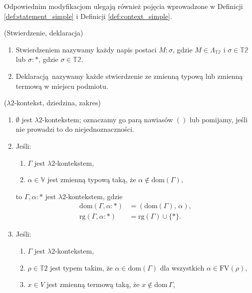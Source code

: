 Odpowiednim modyfikacjom ulegają również pojęcia wprowadzone w Definicji \ref{def:statement_simple} i Definicji \ref{def:context_simple}.
\begin{definicja}(Stwierdzenie, deklaracja)
    \begin{enumerate}
  \setlength\itemsep{0em}
    \item Stwierdzeniem nazywamy każdy napis postaci \(M:\sigma\), gdzie \(M\in\Lambda_\mathbb{T2}\) i \(\sigma\in \mathbb{T2}\) lub \(\sigma:*\), gdzie \(\sigma\in\mathbb{T2}\).
    \item  Deklaracją nazywamy każde stwierdzenie ze zmienną typową lub zmienną termową w miejscu podmiotu.
  \end{enumerate}

\end{definicja}
\begin{definicja}(\(\lambda 2\)-kontekst, dziedzina, zakres)\label{def:f_statement}
  \begin{enumerate}[label=(E\arabic*), ref=(E\arabic*)]
  \setlength\itemsep{0em}
  \item \(\emptyset\) jest \(\lambda 2\)-kontekstem; oznaczamy go parą nawiasów
    \(()\)  lub pomijamy, jeśli nie prowadzi to do niejednoznaczności.\label{def:f_context_1}
  \item Jeśli:\label{def:f_context_2}
    \begin{enumerate}
    \item \(\Gamma\) jest \(\lambda 2\)-kontekstem,    \item \(\alpha\in\mathbb{V}\) jest zmienną typową taką, że \(\alpha\not\in \mathrm{dom}(\Gamma)\),
    \end{enumerate}
    to \(\Gamma, \alpha:*\) jest \(\lambda 2\)-kontekstem, gdzie 
      \begin{align*} 
        \mathrm{dom}(\Gamma, \alpha:*)&=(\mathrm{dom}(\Gamma),\, \alpha),\\
        \mathrm{rg}(\Gamma, \alpha:*)&=\mathrm{rg}(\Gamma)\cup\{*\}.
      \end{align*}
  \item Jeśli:\label{def:f_context_3}
    \begin{enumerate}
     \setlength\itemsep{0em}
     \item \(\Gamma\) jest \(\lambda 2\)-kontekstem,
     \item \(\rho\in\mathbb{T}2\) jest typem takim, że \(\alpha\in\mathrm{dom}(\Gamma)\) dla wszystkich \(\alpha\in\mathrm{FV}(\rho)\),
     \item \(x\in V\) jest zmienną termową taką, że \(x\not\in\mathrm{dom}\,\Gamma\),

\end{enumerate}
\end{enumerate}
\end{definicja}
